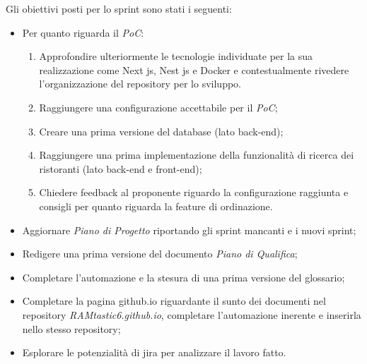 Gli obiettivi posti per lo sprint sono stati i seguenti:
\begin{itemize}
    \item Per quanto riguarda il \emph{PoC}:
    \begin{enumerate}
        \item Approfondire ulteriormente le tecnologie individuate per la sua realizzazione come Next js, Nest js e Docker e contestualmente rivedere l'organizzazione del repository per lo sviluppo.
        \item Raggiungere una configurazione accettabile per il \emph{PoC};
        \item Creare una prima versione del database (lato back-end);
        \item Raggiungere una prima implementazione della funzionalità di ricerca dei ristoranti (lato back-end e front-end);
        \item Chiedere feedback al proponente riguardo la configurazione raggiunta e consigli per quanto riguarda la feature di ordinazione.
    \end{enumerate}
    \item Aggiornare \emph{Piano di Progetto} riportando gli sprint mancanti e i nuovi sprint;
    \item Redigere una prima versione del documento \emph{Piano di Qualifica};
    \item Completare l'automazione e la stesura di una prima versione del glossario;
    \item Completare la pagina github.io riguardante il sunto dei documenti nel repository \emph{RAMtastic6.github.io}, completare l'automazione inerente e inserirla nello stesso repository;
    \item Esplorare le potenzialità di jira per analizzare il lavoro fatto.
\end{itemize}

